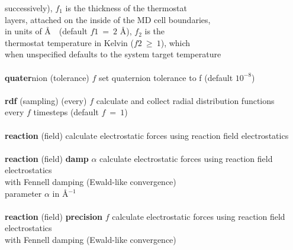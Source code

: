 \begin{tabbing}
\>                                              \> successively), $f_{1}$ is the thickness of the thermostat \\
\>                                              \> layers, attached on the inside of the MD cell boundaries, \\
\>                                              \> in units of \AA~~(default $f{1}~=~2$ \AA), $f_{2}$ is the \\
\>                                              \> thermostat temperature in Kelvin ($f{2}~\ge~1$), which \\
\>                                              \> when unspecified defaults to the system target temperature \\
\>                                              \> \\
\> {\bf quater}nion (tolerance) $f$             \> set quaternion tolerance to f (default $10^{-8}$) \\
\>                                              \> \\
\> {\bf rdf} (sampling) (every) $f$             \> calculate and collect radial distribution functions \\
\>                                              \> every $f$ timesteps (default $f~=~1$) \\
\>                                              \> \\
\> {\bf reaction} (field)                       \> calculate electrostatic forces using reaction field electrostatics \\
\>                                              \> \\
\> {\bf reaction} (field) {\bf damp} $\alpha$   \> calculate electrostatic forces using reaction field electrostatics \\
\>                                              \> with Fennell \cite{fennell-06a} damping (Ewald-like convergence) \\
\>                                              \> parameter $\alpha$ in \AA$^{-1}$ \\
\>                                              \> \\
\> {\bf reaction} (field) {\bf precision} $f$   \> calculate electrostatic forces using reaction field electrostatics \\
\>                                              \> with Fennell \cite{fennell-06a} damping (Ewald-like convergence) \\

\end{tabbing}
